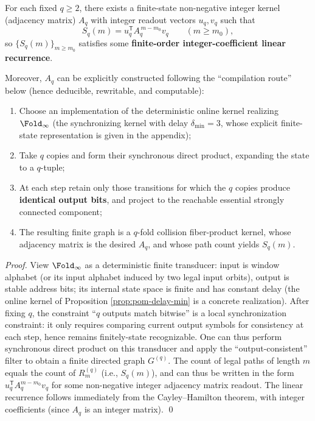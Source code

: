 \begin{proposition}\label{prop:pom-moment-kernel-exists}
For each fixed \(q\ge 2\), there exists a finite-state non-negative integer kernel (adjacency matrix) \(A_q\) with integer readout vectors \(u_q,v_q\) such that
$$
S_q(m)=u_q^{\mathsf T}A_q^{\,m-m_0}v_q\qquad(m\ge m_0),
$$
so \(\{S_q(m)\}_{m\ge m_0}\) satisfies some \textbf{finite-order integer-coefficient linear recurrence}.

Moreover, \(A_q\) can be explicitly constructed following the ``compilation route'' below (hence deducible, rewritable, and computable):
\begin{enumerate}
  \item Choose an implementation of the deterministic online kernel realizing \(\Fold_\infty\) (the synchronizing kernel with delay \(\delta_{\min}=3\), whose explicit finite-state representation is given in the appendix);
  \item Take \(q\) copies and form their synchronous direct product, expanding the state to a \(q\)-tuple;
  \item At each step retain only those transitions for which the \(q\) copies produce \textbf{identical output bits}, and project to the reachable essential strongly connected component;
  \item The resulting finite graph is a \(q\)-fold collision fiber-product kernel, whose adjacency matrix is the desired \(A_q\), and whose path count yields \(S_q(m)\).
\end{enumerate}
\end{proposition}

\begin{proof}
View \(\Fold_\infty\) as a deterministic finite transducer: input is window alphabet (or its input alphabet induced by two legal input orbits), output is stable address bits; its internal state space is finite and has constant delay (the online kernel of Proposition \ref{prop:pom-delay-min} is a concrete realization).
After fixing \(q\), the constraint ``\(q\) outputs match bitwise'' is a local synchronization constraint: it only requires comparing current output symbols for consistency at each step, hence remains finitely-state recognizable.
One can thus perform synchronous direct product on this transducer and apply the ``output-consistent'' filter to obtain a finite directed graph \(G^{(q)}\).
The count of legal paths of length \(m\) equals the count of \(R_m^{(q)}\) (i.e., \(S_q(m)\)), and can thus be written in the form \(u_q^{\mathsf T}A_q^{m-m_0}v_q\) for some non-negative integer adjacency matrix readout.
The linear recurrence follows immediately from the Cayley--Hamilton theorem, with integer coefficients (since \(A_q\) is an integer matrix). \qed
\end{proof}

